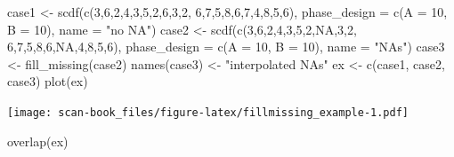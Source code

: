 \documentclass[
]{book}
\newenvironment{Shaded}{\begin{snugshade}}{\end{snugshade}}
\newcommand{\AttributeTok}[1]{\textcolor[rgb]{0.77,0.63,0.00}{#1}}
\newcommand{\ConstantTok}[1]{\textcolor[rgb]{0.00,0.00,0.00}{#1}}
\newcommand{\DecValTok}[1]{\textcolor[rgb]{0.00,0.00,0.81}{#1}}
\newcommand{\FunctionTok}[1]{\textcolor[rgb]{0.00,0.00,0.00}{#1}}
\newcommand{\NormalTok}[1]{#1}
\newcommand{\OtherTok}[1]{\textcolor[rgb]{0.56,0.35,0.01}{#1}}
\newcommand{\StringTok}[1]{\textcolor[rgb]{0.31,0.60,0.02}{#1}}
\begin{document}
\begin{Shaded}
\begin{Highlighting}[]
\NormalTok{case1 }\OtherTok{\textless{}{-}} \FunctionTok{scdf}\NormalTok{(}\FunctionTok{c}\NormalTok{(}\DecValTok{3}\NormalTok{,}\DecValTok{6}\NormalTok{,}\DecValTok{2}\NormalTok{,}\DecValTok{4}\NormalTok{,}\DecValTok{3}\NormalTok{,}\DecValTok{5}\NormalTok{,}\DecValTok{2}\NormalTok{,}\DecValTok{6}\NormalTok{,}\DecValTok{3}\NormalTok{,}\DecValTok{2}\NormalTok{, }\DecValTok{6}\NormalTok{,}\DecValTok{7}\NormalTok{,}\DecValTok{5}\NormalTok{,}\DecValTok{8}\NormalTok{,}\DecValTok{6}\NormalTok{,}\DecValTok{7}\NormalTok{,}\DecValTok{4}\NormalTok{,}\DecValTok{8}\NormalTok{,}\DecValTok{5}\NormalTok{,}\DecValTok{6}\NormalTok{), }
              \AttributeTok{phase\_design =} \FunctionTok{c}\NormalTok{(}\AttributeTok{A =} \DecValTok{10}\NormalTok{, }\AttributeTok{B =} \DecValTok{10}\NormalTok{), }\AttributeTok{name =} \StringTok{"no NA"}\NormalTok{)}
\NormalTok{case2 }\OtherTok{\textless{}{-}} \FunctionTok{scdf}\NormalTok{(}\FunctionTok{c}\NormalTok{(}\DecValTok{3}\NormalTok{,}\DecValTok{6}\NormalTok{,}\DecValTok{2}\NormalTok{,}\DecValTok{4}\NormalTok{,}\DecValTok{3}\NormalTok{,}\DecValTok{5}\NormalTok{,}\DecValTok{2}\NormalTok{,}\ConstantTok{NA}\NormalTok{,}\DecValTok{3}\NormalTok{,}\DecValTok{2}\NormalTok{, }\DecValTok{6}\NormalTok{,}\DecValTok{7}\NormalTok{,}\DecValTok{5}\NormalTok{,}\DecValTok{8}\NormalTok{,}\DecValTok{6}\NormalTok{,}\ConstantTok{NA}\NormalTok{,}\DecValTok{4}\NormalTok{,}\DecValTok{8}\NormalTok{,}\DecValTok{5}\NormalTok{,}\DecValTok{6}\NormalTok{), }
              \AttributeTok{phase\_design =} \FunctionTok{c}\NormalTok{(}\AttributeTok{A =} \DecValTok{10}\NormalTok{, }\AttributeTok{B =} \DecValTok{10}\NormalTok{), }\AttributeTok{name =} \StringTok{"NAs"}\NormalTok{)}
\NormalTok{case3 }\OtherTok{\textless{}{-}} \FunctionTok{fill\_missing}\NormalTok{(case2)}
\FunctionTok{names}\NormalTok{(case3) }\OtherTok{\textless{}{-}} \StringTok{"interpolated NAs"}
\NormalTok{ex }\OtherTok{\textless{}{-}} \FunctionTok{c}\NormalTok{(case1, case2, case3)}
\FunctionTok{plot}\NormalTok{(ex)}
\end{Highlighting}
\end{Shaded}

\texttt{[image: scan-book\_files/figure-latex/fillmissing\_example-1.pdf]}

\begin{Shaded}
\begin{Highlighting}[]
\FunctionTok{overlap}\NormalTok{(ex)}
\end{Highlighting}
\end{Shaded}
\end{document}
